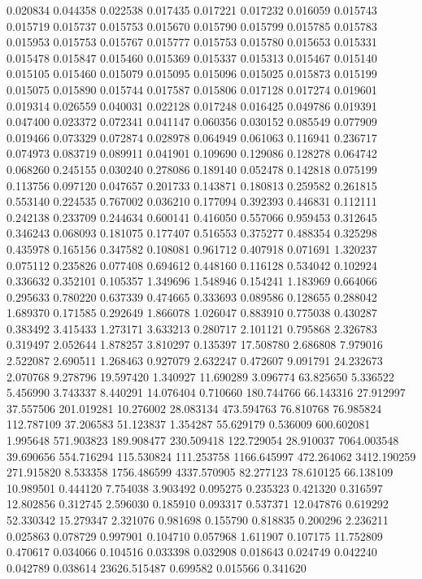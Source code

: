0.020834
0.044358
0.022538
0.017435
0.017221
0.017232
0.016059
0.015743
0.015719
0.015737
0.015753
0.015670
0.015790
0.015799
0.015785
0.015783
0.015953
0.015753
0.015767
0.015777
0.015753
0.015780
0.015653
0.015331
0.015478
0.015847
0.015460
0.015369
0.015337
0.015313
0.015467
0.015140
0.015105
0.015460
0.015079
0.015095
0.015096
0.015025
0.015873
0.015199
0.015075
0.015890
0.015744
0.017587
0.015806
0.017128
0.017274
0.019601
0.019314
0.026559
0.040031
0.022128
0.017248
0.016425
0.049786
0.019391
0.047400
0.023372
0.072341
0.041147
0.060356
0.030152
0.085549
0.077909
0.019466
0.073329
0.072874
0.028978
0.064949
0.061063
0.116941
0.236717
0.074973
0.083719
0.089911
0.041901
0.109690
0.129086
0.128278
0.064742
0.068260
0.245155
0.030240
0.278086
0.189140
0.052478
0.142818
0.075199
0.113756
0.097120
0.047657
0.201733
0.143871
0.180813
0.259582
0.261815
0.553140
0.224535
0.767002
0.036210
0.177094
0.392393
0.446831
0.112111
0.242138
0.233709
0.244634
0.600141
0.416050
0.557066
0.959453
0.312645
0.346243
0.068093
0.181075
0.177407
0.516553
0.375277
0.488354
0.325298
0.435978
0.165156
0.347582
0.108081
0.961712
0.407918
0.071691
1.320237
0.075112
0.235826
0.077408
0.694612
0.448160
0.116128
0.534042
0.102924
0.336632
0.352101
0.105357
1.349696
1.548946
0.154241
1.183969
0.664066
0.295633
0.780220
0.637339
0.474665
0.333693
0.089586
0.128655
0.288042
1.689370
0.171585
0.292649
1.866078
1.026047
0.883910
0.775038
0.430287
0.383492
3.415433
1.273171
3.633213
0.280717
2.101121
0.795868
2.326783
0.319497
2.052644
1.878257
3.810297
0.135397
17.508780
2.686808
7.979016
2.522087
2.690511
1.268463
0.927079
2.632247
0.472607
9.091791
24.232673
2.070768
9.278796
19.597420
1.340927
11.690289
3.096774
63.825650
5.336522
5.456990
3.743337
8.440291
14.076404
0.710660
180.744766
66.143316
27.912997
37.557506
201.019281
10.276002
28.083134
473.594763
76.810768
76.985824
112.787109
37.206583
51.123837
1.354287
55.629179
0.536009
600.602081
1.995648
571.903823
189.908477
230.509418
122.729054
28.910037
7064.003548
39.690656
554.716294
115.530824
111.253758
1166.645997
472.264062
3412.190259
271.915820
8.533358
1756.486599
4337.570905
82.277123
78.610125
66.138109
10.989501
0.444120
7.754038
3.903492
0.095275
0.235323
0.421320
0.316597
12.802856
0.312745
2.596030
0.185910
0.093317
0.537371
12.047876
0.619292
52.330342
15.279347
2.321076
0.981698
0.155790
0.818835
0.200296
2.236211
0.025863
0.078729
0.997901
0.104710
0.057968
1.611907
0.107175
11.752809
0.470617
0.034066
0.104516
0.033398
0.032908
0.018643
0.024749
0.042240
0.042789
0.038614
23626.515487
0.699582
0.015566
0.341620
